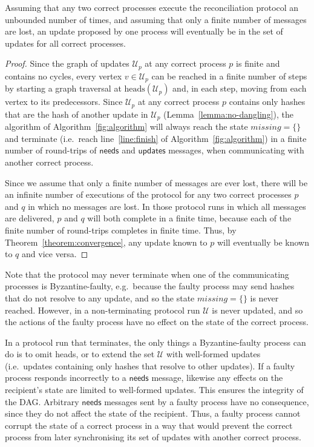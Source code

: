 \documentclass[a4paper,anonymous,USenglish]{lipics-v2019}
\begin{document}
\begin{theorem}\label{theorem:liveness}
Assuming that any two correct processes execute the reconciliation protocol an unbounded number of times, and assuming that only a finite number of messages are lost, an update proposed by one process will eventually be in the set of updates for all correct processes.
\end{theorem}
\begin{proof}
Since the graph of updates $\mathcal{U}_p$ at any correct process $p$ is finite and contains no cycles, every vertex $v \in \mathcal{U}_p$ can be reached in a finite number of steps by starting a graph traversal at $\mathrm{heads}(\mathcal{U}_p)$ and, in each step, moving from each vertex to its predecessors.
Since $\mathcal{U}_p$ at any correct process $p$ contains only hashes that are the hash of another update in $\mathcal{U}_p$ (Lemma~\ref{lemma:no-dangling}), the algorithm of Algorithm~\ref{fig:algorithm} will always reach the state $\mathit{missing} = \{\}$ and terminate (i.e.\ reach line~\ref{line:finish} of Algorithm~\ref{fig:algorithm}) in a finite number of round-trips of $\mathsf{needs}$ and $\mathsf{updates}$ messages, when communicating with another correct process.

Since we assume that only a finite number of messages are ever lost, there will be an infinite number of executions of the protocol for any two correct processes $p$ and $q$ in which no messages are lost.
In those protocol runs in which all messages are delivered, $p$ and $q$ will both complete in a finite time, because each of the finite number of round-trips completes in finite time.
Thus, by Theorem~\ref{theorem:convergence}, any update known to $p$ will eventually be known to $q$ and vice versa.
\end{proof}

Note that the protocol may never terminate when one of the communicating processes is Byzantine-faulty, e.g.\ because the faulty process may send hashes that do not resolve to any update, and so the state $\mathit{missing} = \{\}$ is never reached.
However, in a non-terminating protocol run $\mathcal{U}$ is never updated, and so the actions of the faulty process have no effect on the state of the correct process.

In a protocol run that terminates, the only things a Byzantine-faulty process can do is to omit heads, or to extend the set $\mathcal{U}$ with well-formed updates (i.e.\ updates containing only hashes that resolve to other updates).
If a faulty process responds incorrectly to a $\mathsf{needs}$ message, likewise any effects on the recipient's state are limited to well-formed updates.
This ensures the integrity of the DAG.
Arbitrary $\mathsf{needs}$ messages sent by a faulty process have no consequence, since they do not affect the state of the recipient.
Thus, a faulty process cannot corrupt the state of a correct process in a way that would prevent the correct process from later synchronising its set of updates with another correct process.
\end{document}
